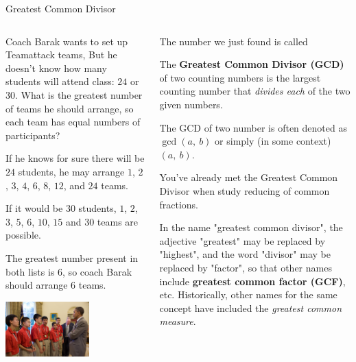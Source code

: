 \documentclass[9pt,aspectratio=169]{beamer}
\begin{document}
\begin{frame}{Greatest Common Divisor}
  \begin{columns}[T]
    \begin{column}{0.5\textwidth}
      \begin{problem}
        Coach Barak wants to set up Teamattack teams, But he doesn't know how many students will attend class: $24$ or $30$. What is the greatest number of teams he should arrange, so each team has equal numbers of participants?
      \end{problem}
      If he knows for sure there will be $24$ students, he may arrange $1$, $2$, $3$, $4$, $6$, $8$, $12$, and $24$ teams.\smallskip
      
      If it would be $30$ students, $1$, $2$, $3$, $5$, $6$, $10$, $15$ and $30$ teams are possible.
      \smallskip
      
      The greatest number present in both lists is $6$, so coach Barak should arrange $6$ teams.
      \begin{center}
        \includegraphics[width=0.6\textwidth]{04 - Number Theory 101/barak.jpg}
      \end{center}
    \end{column}
    \begin{column}{0.5\textwidth}
      The number we just found is called
      \begin{definition}
        The \textbf{Greatest Common Divisor (GCD)} of two counting numbers is the largest counting number that \emph{divides each} of the two given numbers.
      \end{definition}
      
      The GCD of two number is often denoted as $\gcd(a,\ b)$ or simply (in some context) $(a,\ b)$.\medskip

      You've already met the Greatest Common Divisor when study reducing of common fractions.\medskip 

      In the name "greatest common divisor", the adjective "greatest" may be replaced by "highest", and the word "divisor" may be replaced by "factor", so that other names include \textbf{greatest common factor (GCF)}, etc. Historically, other names for the same concept have included the \emph{greatest common measure}.
    \end{column}
  \end{columns}
\end{frame}
\end{document}
